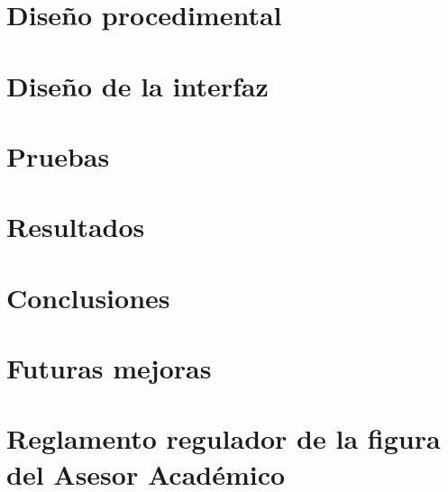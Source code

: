 \documentclass[a4paper,12pt]{book}
\begin{document}
   \chapter{Diseño procedimental}

   \chapter{Diseño de la interfaz}
      
      

   \chapter{Pruebas}\label{pruebas}
      
      
      

   \chapter{Resultados}

   \chapter{Conclusiones}

   \chapter{Futuras mejoras}
    

   \listoffigures

   

   \appendix
   \chapter{Reglamento regulador de la figura del Asesor Académico}\label{a1}
   
\end{document}
